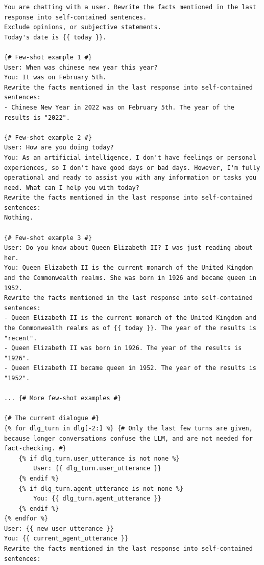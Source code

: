 \documentclass[11pt]{article}
\newcommand{\system}[0]{WikiChat\xspace}
\begin{document}
\begin{table}
\begin{lstlisting}[basicstyle=\ttfamily\small]
You are chatting with a user. Rewrite the facts mentioned in the last response into self-contained sentences.
Exclude opinions, or subjective statements.
Today's date is {{ today }}.

{# Few-shot example 1 #}
User: When was chinese new year this year?
You: It was on February 5th.
Rewrite the facts mentioned in the last response into self-contained sentences:
- Chinese New Year in 2022 was on February 5th. The year of the results is "2022".

{# Few-shot example 2 #}
User: How are you doing today?
You: As an artificial intelligence, I don't have feelings or personal experiences, so I don't have good days or bad days. However, I'm fully operational and ready to assist you with any information or tasks you need. What can I help you with today?
Rewrite the facts mentioned in the last response into self-contained sentences:
Nothing.

{# Few-shot example 3 #}
User: Do you know about Queen Elizabeth II? I was just reading about her.
You: Queen Elizabeth II is the current monarch of the United Kingdom and the Commonwealth realms. She was born in 1926 and became queen in 1952.
Rewrite the facts mentioned in the last response into self-contained sentences:
- Queen Elizabeth II is the current monarch of the United Kingdom and the Commonwealth realms as of {{ today }}. The year of the results is "recent".
- Queen Elizabeth II was born in 1926. The year of the results is "1926".
- Queen Elizabeth II became queen in 1952. The year of the results is "1952".

... {# More few-shot examples #}

{# The current dialogue #}
{% for dlg_turn in dlg[-2:] %} {# Only the last few turns are given, because longer conversations confuse the LLM, and are not needed for fact-checking. #}
    {% if dlg_turn.user_utterance is not none %}
        User: {{ dlg_turn.user_utterance }}
    {% endif %}
    {% if dlg_turn.agent_utterance is not none %}
        You: {{ dlg_turn.agent_utterance }}
    {% endif %}
{% endfor %}
User: {{ new_user_utterance }}
You: {{ current_agent_utterance }}
Rewrite the facts mentioned in the last response into self-contained sentences:
\end{lstlisting}
\caption{Claim extraction prompt of \system (Stage 4). This prompt has 8 few-shot examples.}
\label{prompt:claim-splitting}
\end{table}
\end{document}
